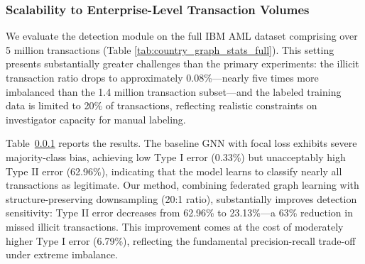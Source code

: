 \documentclass[11pt,english]{article}
\begin{document}
\begin{table}[h!]
\centering
\caption{Statistics of transaction by country}
\label{tab:country_graph_stats_full}
\end{table}

\subsubsection{Scalability to Enterprise-Level Transaction Volumes}
\label{scalability_analysis}
We evaluate the detection module on the full IBM AML dataset comprising over 5 million transactions (Table \ref{tab:country_graph_stats_full}). This setting presents substantially greater challenges than the primary experiments: the illicit transaction ratio drops to approximately 0.08\%—nearly five times more imbalanced than the 1.4 million transaction subset—and the labeled training data is limited to 20\% of transactions, reflecting realistic constraints on investigator capacity for manual labeling.

Table~\ref{scalability_analysis} reports the results. The baseline GNN with focal loss exhibits severe majority-class bias, achieving low Type I error (0.33\%) but unacceptably high Type II error (62.96\%), indicating that the model learns to classify nearly all transactions as legitimate. Our method, combining federated graph learning with structure-preserving downsampling (20:1 ratio), substantially improves detection sensitivity: Type II error decreases from 62.96\% to 23.13\%—a 63\% reduction in missed illicit transactions. This improvement comes at the cost of moderately higher Type I error (6.79\%), reflecting the fundamental precision-recall trade-off under extreme imbalance.
\end{document}
